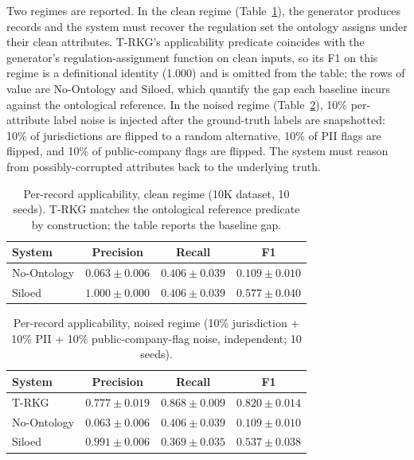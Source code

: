 \documentclass{ieeeaccess}
\begin{document}
Two regimes are reported. In the clean regime (Table~\ref{tab:f1clean}), the generator produces records and the system must recover the regulation set the ontology assigns under their clean attributes. T-RKG's applicability predicate coincides with the generator's regulation-assignment function on clean inputs, so its F1 on this regime is a definitional identity (1.000) and is omitted from the table; the rows of value are No-Ontology and Siloed, which quantify the gap each baseline incurs against the ontological reference. In the noised regime (Table~\ref{tab:f1noise}), 10\% per-attribute label noise is injected after the ground-truth labels are snapshotted: 10\% of jurisdictions are flipped to a random alternative, 10\% of PII flags are flipped, and 10\% of public-company flags are flipped. The system must reason from possibly-corrupted attributes back to the underlying truth.

\begin{table}[t]
\centering
\caption{Per-record applicability, clean regime (10K dataset, 10 seeds). T-RKG matches the ontological reference predicate by construction; the table reports the baseline gap.}
\label{tab:f1clean}
\begin{tabular}{lccc}
\hline\hline
System & Precision & Recall & F1 \\
\hline
No-Ontology       & $0.063 \pm 0.006$ & $0.406 \pm 0.039$ & $0.109 \pm 0.010$ \\
Siloed            & $1.000 \pm 0.000$ & $0.406 \pm 0.039$ & $0.577 \pm 0.040$ \\
\hline\hline
\end{tabular}
\end{table}

\begin{table}[t]
\centering
\caption{Per-record applicability, noised regime (10\% jurisdiction + 10\% PII + 10\% public-company-flag noise, independent; 10 seeds).}
\label{tab:f1noise}
\begin{tabular}{lccc}
\hline\hline
System & Precision & Recall & F1 \\
\hline
T-RKG       & $0.777 \pm 0.019$ & $0.868 \pm 0.009$ & $0.820 \pm 0.014$ \\
No-Ontology & $0.063 \pm 0.006$ & $0.406 \pm 0.039$ & $0.109 \pm 0.010$ \\
Siloed      & $0.991 \pm 0.006$ & $0.369 \pm 0.035$ & $0.537 \pm 0.038$ \\
\hline\hline
\end{tabular}
\end{table}
\end{document}
